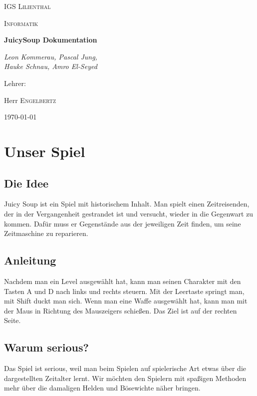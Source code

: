 \documentclass[12pt]{report}
\begin{document}
\begin{titlepage}
    \centering
    {\scshape\LARGE IGS Lilienthal \par}
	\vspace{1cm}
	{\scshape\Large Informatik \par}
	\vspace{1.5cm}
	{\huge\bfseries JuicySoup Dokumentation \par}
	\vspace{2cm}
	{\Large\itshape Leon Kommerau, Pascal Jung, \\Hauke Schnau, Amro El-Seyed \par}
	\vfill
	Lehrer:\par
	Herr \textsc{Engelbertz}

	\vfill

	{\large \today\par}
    \end{titlepage}

    \tableofcontents


    \chapter{Unser Spiel}

    \section{Die Idee}
    Juicy Soup ist ein Spiel mit historischem Inhalt. Man spielt einen Zeitreisenden,
    der in der Vergangenheit gestrandet ist und versucht, wieder in die Gegenwart
    zu kommen. Dafür muss er Gegenstände aus der jeweiligen Zeit finden, um
    seine Zeitmaschine zu reparieren.

    \section{Anleitung}
    Nachdem man ein Level ausgewählt hat, kann man seinen Charakter mit den
    Tasten A und D nach links und rechts steuern. Mit der Leertaste springt man,
    mit Shift duckt man sich. Wenn man eine Waffe ausgewählt hat, kann man mit der
    Maus in Richtung des Mauszeigers schießen.
    Das Ziel ist auf der rechten Seite.

    \section{Warum serious?}
    Das Spiel ist serious, weil man beim Spielen auf spielerische Art
    etwas über die dargestellten Zeitalter lernt. Wir möchten den Spielern
    mit spaßigen Methoden mehr über die damaligen Helden und Bösewichte näher
    bringen.
\end{document}
